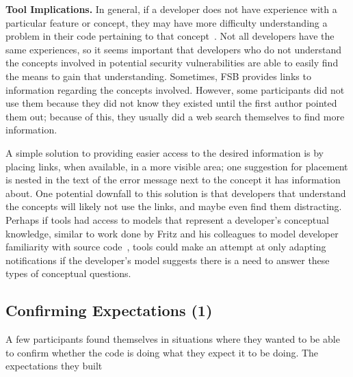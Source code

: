 \documentclass[conference]{IEEEtran}
\begin{document}
\noindent\textbf{Tool Implications.}
In general, if a developer does not have experience with a particular feature or concept, they may have more difficulty understanding a problem in their code pertaining to that concept~\cite{wiedenbeck1993mental}.
Not all developers have the same experiences, so it seems important that developers who do not understand the concepts involved in potential security vulnerabilities are able to easily find the means to gain that understanding.
Sometimes, FSB provides links to information regarding the concepts involved. 
However, some participants did not use them because they did not know they existed until the first author pointed them out; because of this, they usually did a web search themselves to find more information.

A simple solution to providing easier access to the desired information is by placing links, when available, in a  more visible area; one suggestion for placement is nested in the text of the error message next to the concept it has information about. 
One potential downfall to this solution is that developers that understand the concepts will likely not use the links, and maybe even find them distracting.   
Perhaps if tools had access to models that represent a developer's conceptual knowledge, similar to work done by Fritz and his colleagues to model developer familiarity with source code~\cite{fritz2010degree}, tools could make an attempt at only adapting notifications if the developer's model suggests there is a need to answer these types of conceptual questions.


\noindent\subsection{\textbf{Confirming Expectations (1)}}\label{ce}

A few participants found themselves in situations where they wanted to be able to confirm whether the code is doing what they expect it to be doing. 
The expectations they built 
\end{document}
